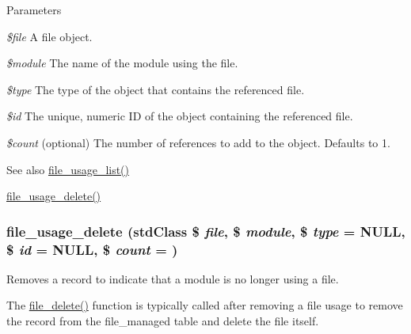 \begin{DoxyParams}{Parameters}
\item[{\em \$file}]A file object. \item[{\em \$module}]The name of the module using the file. \item[{\em \$type}]The type of the object that contains the referenced file. \item[{\em \$id}]The unique, numeric ID of the object containing the referenced file. \item[{\em \$count}](optional) The number of references to add to the object. Defaults to 1.\end{DoxyParams}
\begin{DoxySeeAlso}{See also}
\hyperlink{group__file_ga6399c4096559ffbe81cfcb22db782bc4}{file\_\-usage\_\-list()} 

\hyperlink{group__file_gaf8562c4494373ec51079bb0999a8ae3a}{file\_\-usage\_\-delete()} 
\end{DoxySeeAlso}
\hypertarget{group__file_gaf8562c4494373ec51079bb0999a8ae3a}{
\subsubsection[{file\_\-usage\_\-delete}]{\setlength{\rightskip}{0pt plus 5cm}file\_\-usage\_\-delete (stdClass \$ {\em file}, \/  \$ {\em module}, \/  \$ {\em type} = {\ttfamily NULL}, \/  \$ {\em id} = {\ttfamily NULL}, \/  \$ {\em count} = {})}}
\label{group__file_gaf8562c4494373ec51079bb0999a8ae3a}
Removes a record to indicate that a module is no longer using a file.

The \hyperlink{group__file_gac7503f0dcdea965d68e4a242e7760921}{file\_\-delete()} function is typically called after removing a file usage to remove the record from the file\_\-managed table and delete the file itself.


